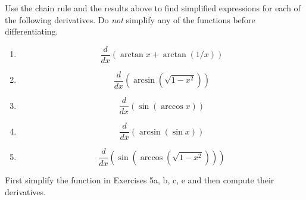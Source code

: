 \documentclass{ximera}
\begin{document}
\begin{exercise} \label{Exmmv8eflzz}
Use the chain rule and the results above to find simplified expressions for each of the following derivatives. Do \emph{not} simplify any of the functions before differentiating.

\begin{enumerate}
\item 
\[
        \frac{d}{dx} \left( \arctan x + \arctan (1/x)  \right)
\]

\item 
\[
     \frac{d}{dx} \left( \arcsin \left( \sqrt{1-x^2} \right) \right)
\]

\item 
\[
    \frac{d}{dx} \left( \sin(\arccos x) \right)
\]

\item 
\[
    \frac{d}{dx} \left( \arcsin (\sin x) \right)
\]

\item 
\[
     \frac{d}{dx} \left( \sin\left( \arccos \left( \sqrt{1-x^2}\right) \right) \right)
\]

\end{enumerate}
\end{exercise}

\begin{exercise} \label{ExLfm000}
First simplify the function in Exercises 5a, b, c, e and then compute their derivatives. 
\end{exercise}
\end{document}
